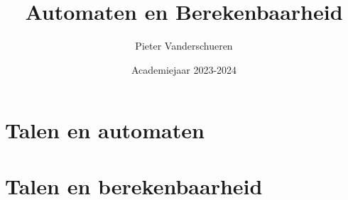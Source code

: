 \documentclass{exam}
\title{Automaten en Berekenbaarheid}
\author{Pieter Vanderschueren}
\date{Academiejaar 2023-2024}
\begin{document}
\begin{titlingpage}
\maketitle
\end{titlingpage}

\newpage

    


\newpage

\tableofcontents

\newpage


\section{Talen en automaten}

\vspace{0.5cm}



\newpage

\section{Talen en berekenbaarheid}

\vspace{0.5cm}




\end{document}
